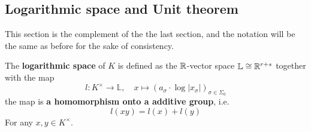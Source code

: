     \subsection{Logarithmic space and Unit theorem}
    This section is the complement of the the last section, and the notation will be the same as before for the sake of consistency. 

    \begin{definition}
        The \textbf{logarithmic space} of \(K\) is defined as the \(\mathbb{R}\)-vector space \(\mathbb{L} \cong \mathbb{R}^{r+s}\) together with the map
        \[l: K^\times \to \mathbb{L}, \quad x \mapsto (a_\sigma \cdot \log|x_{\sigma}|)_{\sigma \in \Sigma_0}\]
        the map is \textbf{a homomorphism onto a additive group}, i.e.
        \[l(xy) = l(x) + l(y)\] 
        For any \(x,y \in K^\times\).
    \end{definition}


